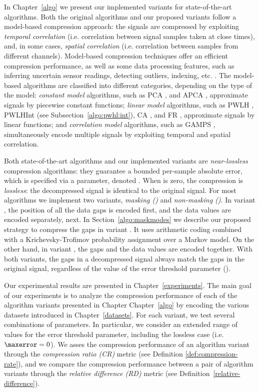 In Chapter~\ref{algo} we present our implemented variants for state-of-the-art algorithms. Both the original algorithms and our proposed variants follow a model-based compression approach: the signals are compressed by exploiting \textit{temporal correlation} (i.e. correlation between signal samples taken at close times), and, in some cases, \textit{spatial correlation} (i.e. correlation between samples from different channels). Model-based compression techniques offer an efficient compression performance, as well as some data processing features, such as inferring uncertain sensor readings, detecting outliers, indexing, etc. \cite{AnEva2013}. The model-based algorithms are classified into different categories, depending on the type of the model: \textit{constant model} algorithms, such as PCA \cite{coder:pca}, and APCA \cite{coder:apca}, approximate signals by piecewise constant functions; \textit{linear model} algorithms, such as PWLH \cite{coder:pwlh}, PWLHInt (see Subsection~\ref{algo:pwhl:int}), CA \cite{coder:ca}, and FR \cite{coder:fr}, approximate signals by linear functions; and \textit{correlation model} algorithms, such as GAMPS \cite{coder:gamps}, simultaneously encode multiple signals by exploiting temporal and spatial correlation.


Both state-of-the-art algorithms and our implemented variants are \textit{near-lossless} compression algorithms: they guarantee a bounded per-sample absolute error, which is specified via a parameter, denoted \maxerror. When \maxerror is zero, the compression is \textit{lossless}: the decompressed signal is identical to the original signal. For most algorithms we implement two variants, \textit{masking (\maskalgo)} and \textit{non-masking (\NOmaskalgo)}. In variant \maskalgo, the position of all the data gaps is encoded first, and the data values are encoded separately, next. In Section~\ref{algo:maskmodes} we describe our proposed strategy to compress the gaps in variant \maskalgo. It uses arithmetic coding \cite{ac2, Cover2005} combined with a Krichevsky-Trofimov probability assignment \cite{ktestimator} over a Markov model. On the other hand, in variant \NOmaskalgo, the gaps and the data values are encoded together. With both variants, the gaps in a decompressed signal always match the gaps in the original signal, regardless of the value of the error threshold parameter (\maxerror).


Our experimental results are presented in Chapter~\ref{experiments}. The main goal of our experiments is to analyze the compression performance of each of the algorithm variants presented in Chapter Chapter~\ref{algo} by encoding the various datasets introduced in Chapter~\ref{datasets}. For each variant, we test several combinations of parameters. In particular, we consider an extended range of values for the error threshold parameter, including the lossless case (i.e. $\maxerror=0$). We asses the compression performance of an algorithm variant through the \textit{compression ratio (CR)} metric (see Definition \ref{def:compression-rate}), and we compare the compression performance between a pair of algorithm variants through the \textit{relative difference (RD)} metric (see Definition~\ref{relative-difference}). 


